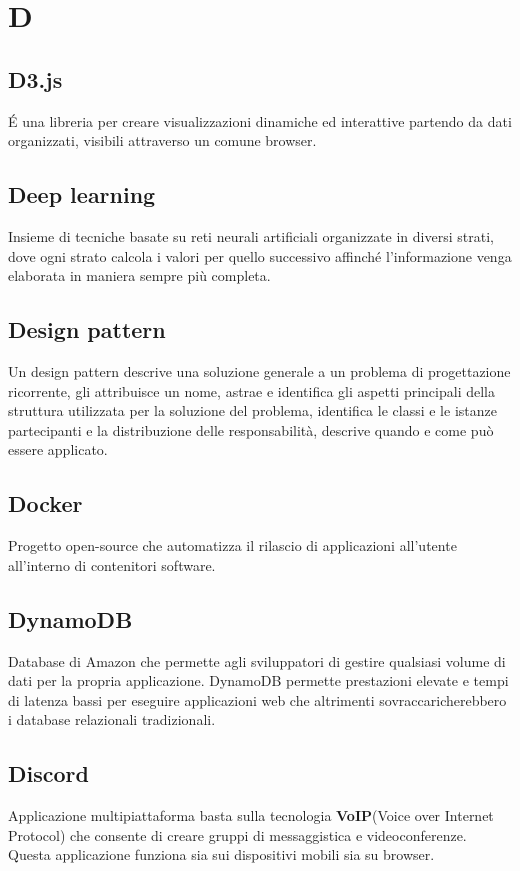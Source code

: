 \section*{D}
\markright{}
\subsection*{D3.js}
\'E una libreria  per creare visualizzazioni dinamiche ed interattive partendo da dati organizzati, visibili attraverso un comune browser.

\subsection*{Deep learning}
Insieme di tecniche basate su reti neurali artificiali organizzate in diversi strati, dove ogni strato calcola i valori per quello successivo affinché l'informazione venga elaborata in maniera sempre più completa.

\subsection*{Design pattern}
Un design pattern descrive una soluzione generale a un problema di progettazione ricorrente, gli attribuisce un nome, astrae e identifica gli aspetti principali della struttura utilizzata per la soluzione del problema, identifica le classi e le istanze partecipanti e la distribuzione delle responsabilità, descrive quando e come può essere applicato. 


\subsection*{Docker}
Progetto open-source che automatizza il rilascio di applicazioni all'utente all'interno di contenitori software.

\subsection*{DynamoDB}
Database  di Amazon che permette agli sviluppatori di gestire qualsiasi volume di dati per la propria applicazione. DynamoDB permette prestazioni elevate e tempi di latenza bassi per eseguire applicazioni web che altrimenti sovraccaricherebbero i database relazionali tradizionali.

\subsection*{Discord}
Applicazione multipiattaforma basta sulla tecnologia \textbf{VoIP}(Voice over Internet Protocol) che consente di creare gruppi di messaggistica e videoconferenze. Questa applicazione funziona sia sui dispositivi mobili sia su browser.

